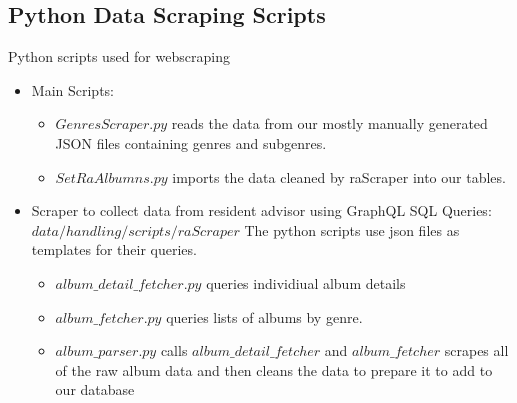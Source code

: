 \documentclass{article}
\begin{document}
    \subsection{Python Data Scraping Scripts} Python scripts used for webscraping
    \begin{itemize}
        \item Main Scripts:
        \begin{itemize}
            \item $GenresScraper.py$ reads the data from our mostly manually generated JSON files containing genres and subgenres.
            \item $SetRaAlbumns.py$ imports the data cleaned by raScraper into our tables.
        \end{itemize}
        \item Scraper to collect data from resident advisor using GraphQL SQL Queries: $data/handling/scripts/raScraper$
        The python scripts use json files as templates for their queries.
        \begin{itemize}
            \item $album\_detail\_fetcher.py$ queries individiual album details
            \item $album\_fetcher.py$ queries lists of albums by genre.
            \item $album\_parser.py$ calls $album\_detail\_fetcher$ and $album\_fetcher$ scrapes all of the raw album data and then cleans the data to prepare it to add to our database
        \end{itemize}
    \end{itemize}
\end{document}
